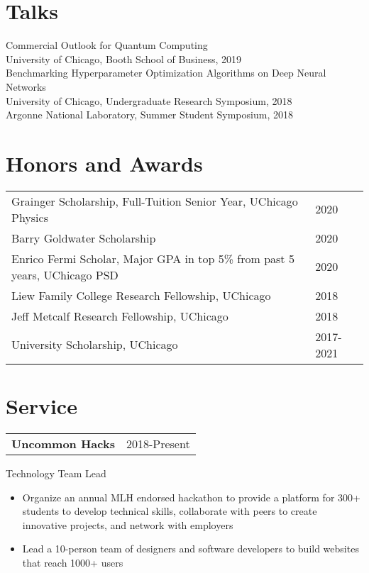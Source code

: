 \documentclass[letterpaper, 12pt]{article}
\begin{document}
\section{Talks}
Commercial Outlook for Quantum Computing\\
\qquad University of Chicago, Booth School of Business, 2019\\
Benchmarking Hyperparameter Optimization Algorithms on Deep Neural Networks\\
\qquad University of Chicago, Undergraduate Research Symposium, 2018\\
\qquad Argonne National Laboratory, Summer Student Symposium, 2018\\

\section{Honors and Awards}
\begin{tabular}{@{} L{14.5cm} @{} R{2.01cm} @{}}
  Grainger Scholarship, Full-Tuition Senior Year, UChicago Physics & 2020\\
  Barry Goldwater Scholarship & 2020\\
  Enrico Fermi Scholar, Major GPA in top 5\% from past 5 years, UChicago PSD & 2020\\
  Liew Family College Research Fellowship, UChicago & 2018\\
  Jeff Metcalf Research Fellowship, UChicago & 2018 \\
  University Scholarship, UChicago & 2017-2021\\
\end{tabular}

\section{Service}
\begin{tabular}{@{} L{12cm} @{} R{4.51cm} @{}}
  \textbf{Uncommon Hacks} & 2018-Present\\
\end{tabular}
Technology Team Lead\\
\begin{itemize}
\item Organize an annual MLH endorsed hackathon to provide a platform for 300+
  students to develop technical skills,
  collaborate with peers to create innovative projects, and network with employers
\item Lead a 10-person team of designers and software developers
  to build websites that reach 1000+ users
\end{itemize}
\end{document}
